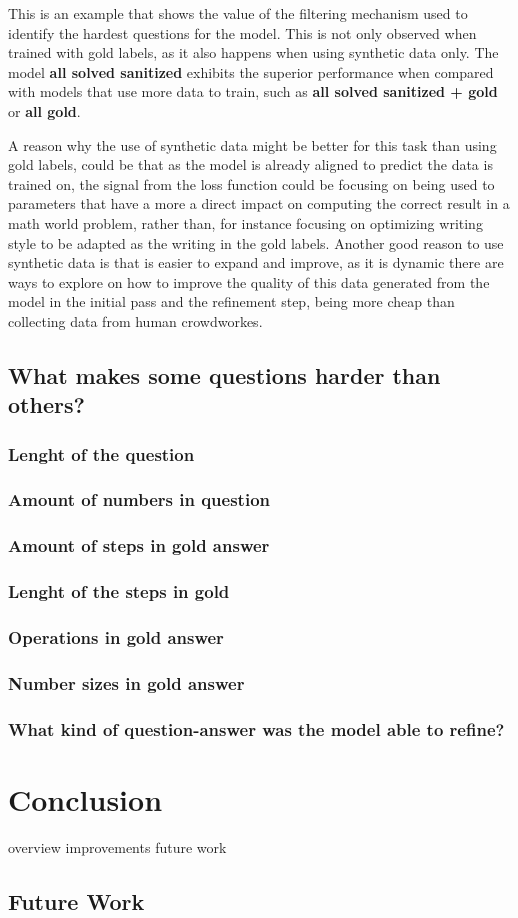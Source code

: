 \documentclass[a4paper,10pt]{article}
\begin{document}
This is an example that shows the value of the filtering mechanism used to identify the hardest questions for the model. This is not only observed when trained with gold labels, as it also happens when using synthetic data only. The model \textbf{all solved sanitized} exhibits the superior performance when compared with models that use more data to train, such as \textbf{all solved sanitized + gold} or \textbf{all gold}.

A reason why the use of synthetic data might be better for this task than using gold labels, could be that as the model is already aligned to predict the data is trained on, the signal from the loss function could be focusing on being used to parameters that have a more a direct impact on computing the correct result in a math world problem, rather than, for instance focusing on optimizing writing style to be adapted as the writing in the gold labels. Another good reason to use synthetic data is that is easier to expand and improve, as it is dynamic there are ways to explore on how to improve the quality of this data generated from the model in the initial pass and the refinement step, being more cheap than collecting data from human crowdworkes. 

\subsection{What makes some questions harder than others?}
\subsubsection{Lenght of the question}
\subsubsection{Amount of numbers in question}
\subsubsection{Amount of steps in gold answer}
\subsubsection{Lenght of the steps in gold}
\subsubsection{Operations in gold answer}
\subsubsection{Number sizes in gold answer}
\subsubsection{What kind of question-answer was the model able to refine?}

\section{Conclusion}
overview improvements future work
\subsection{Future Work}
\end{document}
